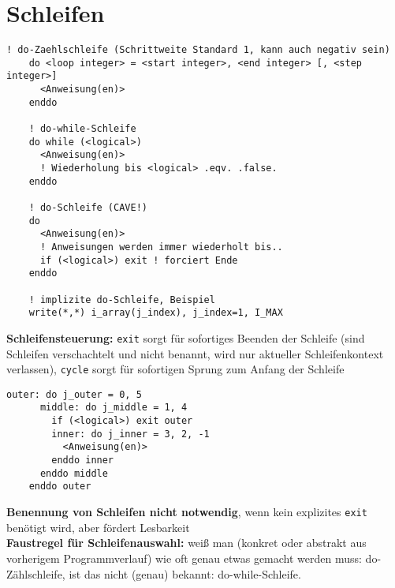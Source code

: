 \documentclass[a4paper, twocolumn]{scrarticle}
\begin{document}
  \section{Schleifen}
  \begin{lstlisting}[caption={\bfseries do-Schleifen}]
    ! do-Zaehlschleife (Schrittweite Standard 1, kann auch negativ sein)
    do <loop integer> = <start integer>, <end integer> [, <step integer>]
      <Anweisung(en)>
    enddo
    
    ! do-while-Schleife
    do while (<logical>)
      <Anweisung(en)>
      ! Wiederholung bis <logical> .eqv. .false.
    enddo
    
    ! do-Schleife (CAVE!)
    do
      <Anweisung(en)>
      ! Anweisungen werden immer wiederholt bis..
      if (<logical>) exit ! forciert Ende
    enddo
    
    ! implizite do-Schleife, Beispiel
    write(*,*) i_array(j_index), j_index=1, I_MAX
  \end{lstlisting}
 \textbf{Schleifensteuerung:} \lstinline|exit| sorgt für sofortiges Beenden der Schleife (sind Schleifen verschachtelt und nicht benannt, wird nur aktueller Schleifenkontext verlassen), \lstinline|cycle| sorgt für sofortigen Sprung zum Anfang der Schleife 
  \begin{lstlisting}[caption={\bfseries Beispiel: Benannte do-Schleifen und explizites exit}]
    outer: do j_outer = 0, 5
      middle: do j_middle = 1, 4
        if (<logical>) exit outer
        inner: do j_inner = 3, 2, -1
          <Anweisung(en)>
        enddo inner
      enddo middle
    enddo outer
  \end{lstlisting}
 \textbf{Benennung von Schleifen nicht notwendig}, wenn kein explizites \lstinline|exit| benötigt wird, aber fördert Lesbarkeit\\
  \textbf{Faustregel für Schleifenauswahl:} weiß man (konkret oder abstrakt aus vorherigem Programmverlauf) wie oft genau etwas gemacht werden muss: do-Zählschleife, ist das nicht (genau) bekannt: do-while-Schleife.
  
\end{document}
